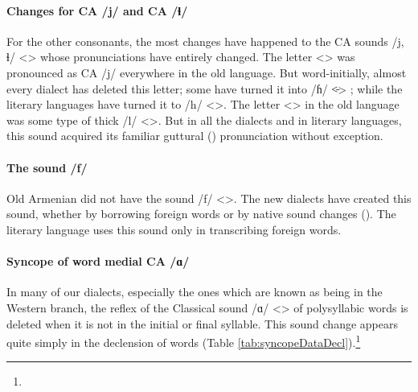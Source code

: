 \paragraph{Changes for CA /j/ and CA /ɬ/}\label{sec:AdjarianIntro:difference:soundChange:VelarGlide}

For the other consonants, the most changes have happened to the CA sounds /j, ɬ/ <> whose pronunciations have entirely changed. The letter <> was pronounced as CA /j/ everywhere in the old language. But word-initially, almost every dialect has deleted this letter; some have turned it into /ɦ/ <̵> ; while the literary languages have turned it to /h/ <>. The letter <> in the old language was some type of thick /l/ <>.  But in all the dialects and in literary languages, this sound acquired its familiar guttural () pronunciation without exception. 

\paragraph{The sound /f/}

Old Armenian did not have the sound /f/ <>. The new dialects have created this sound, whether by borrowing foreign words or by native sound changes (). The literary language uses this sound only in transcribing foreign words. 

\paragraph{Syncope of word medial CA /ɑ/}

In many of our dialects, especially the ones which are known as being in the Western branch, the reflex of the Classical sound /ɑ/ <> of polysyllabic words is deleted when it is not in the initial or final syllable. This sound change appears quite simply in the declension of words (Table \ref{tab:syncopeDataDecl}).\footnote{}


